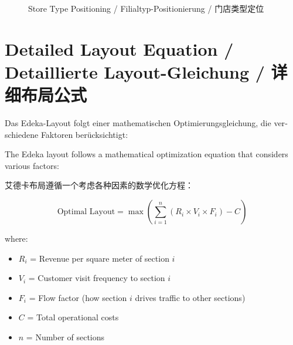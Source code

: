 \begin{figure}[h]
\caption{Store Type Positioning / Filialtyp-Positionierung / 门店类型定位}
\end{figure}

\section{Detailed Layout Equation / Detaillierte Layout-Gleichung / 详细布局公式}

\begin{otherlanguage}{ngerman}
Das Edeka-Layout folgt einer mathematischen Optimierungsgleichung, die verschiedene Faktoren berücksichtigt:
\end{otherlanguage}

The Edeka layout follows a mathematical optimization equation that considers various factors:

艾德卡布局遵循一个考虑各种因素的数学优化方程：

\begin{equation}
\text{Optimal Layout} = \max \left( \sum_{i=1}^{n} \left( R_i \times V_i \times F_i \right) - C \right)
\end{equation}

where:
\begin{itemize}
    \item $R_i$ = Revenue per square meter of section $i$
    \item $V_i$ = Customer visit frequency to section $i$
    \item $F_i$ = Flow factor (how section $i$ drives traffic to other sections)
    \item $C$ = Total operational costs
    \item $n$ = Number of sections
\end{itemize}

